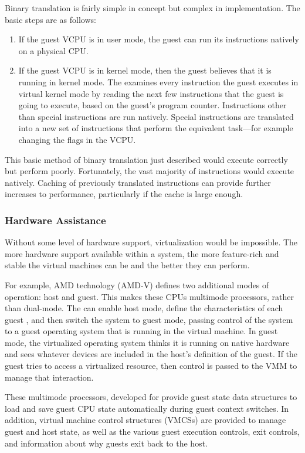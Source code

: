 Binary translation is fairly simple in concept but complex in implementation.
The basic steps are as follows:
\begin{enumerate}[noitemsep]
\item If the guest VCPU is in user mode, the guest can run its instructions natively on a physical CPU.\@
\item If the guest VCPU is in kernel mode, then the guest believes that it is running in kernel mode.
  The  examines every instruction the guest executes in virtual kernel mode by reading the next few instructions that the guest is going to execute, based on the guest's program counter.
  Instructions other than special instructions are run natively.
  Special instructions are translated into a new set of instructions that perform the equivalent task—for example changing the flags in the VCPU.\@
\end{enumerate}

This basic method of binary translation just described would execute correctly but perform poorly.
Fortunately, the vast majority of instructions would execute natively.
Caching of previously translated instructions can provide further increases to performance, particularly if the cache is large enough.

\subsubsection{Hardware Assistance}\label{subsubsec:VM_Hardware_Assistance}
Without some level of hardware support, virtualization would be impossible.
The more hardware support available within a system, the more feature-rich and stable the virtual machines can be and the better they can perform.

For example, AMD  technology (AMD-V) defines two additional modes of operation: host and guest.
This makes these CPUs multimode processors, rather than dual-mode.
The  can enable host mode, define the characteristics of each guest , and then switch the system to guest mode, passing control of the system to a guest operating system that is running in the virtual machine.
In guest mode, the virtualized operating system thinks it is running on native hardware and sees whatever devices are included in the host's definition of the guest.
If the guest tries to access a virtualized resource, then control is passed to the VMM to manage that interaction.

These multimode processors, developed for  provide guest  state data structures to load and save guest CPU state automatically during guest context switches.
In addition, virtual machine control structures (VMCSs) are provided to manage guest and host state, as well as the various guest execution controls, exit controls, and information about why guests exit back to the host.


